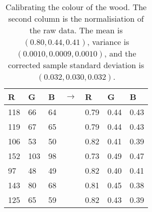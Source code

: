 \documentclass[twocolumn]{article}
\begin{document}
\begin{table}[htb]
\centering
\begin{tabular}{@{(}l@{, }l@{, }l@{)} l @{(}l@{, }l@{, }l@{)}}
R & G & B & $\rightarrow$ & R & G & B \\
\hline
118 & 66 & 64 &  & 0.79 & 0.44 & 0.43 \\
119 & 67 & 65 &  & 0.79 & 0.44 & 0.43 \\
106 & 53 & 50 &  & 0.82 & 0.41 & 0.39 \\
152 & 103 & 98 &  & 0.73 & 0.49 & 0.47 \\
97 & 48 & 49 &  & 0.82 & 0.40 & 0.41 \\
143 & 80 & 68 &  & 0.81 & 0.45 & 0.38 \\
125 & 65 & 59 &  & 0.82 & 0.43 & 0.39 \\
\end{tabular}
\caption{Calibrating the colour of the wood. The second column is the normalisiation of the raw data.
The mean is $(0.80, 0.44, 0.41)$, variance is $(0.0010, 0.0009, 0.0010)$, and the corrected sample standard deviation is $(0.032, 0.030, 0.032)$.}
\label{wood}
\end{table}
\end{document}
